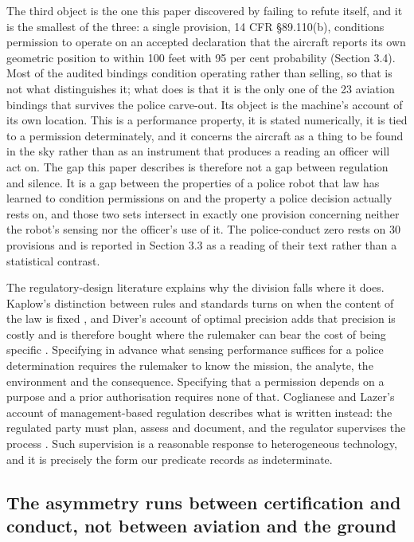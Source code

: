 The third object is the one this paper discovered by failing to refute itself, and it is the smallest of the three: a single provision, 14 CFR \S{}89.110(b), conditions permission to operate on an accepted declaration that the aircraft reports its own geometric position to within 100 feet with 95 per cent probability (Section 3.4). Most of the audited bindings condition operating rather than selling, so that is not what distinguishes it; what does is that it is the only one of the 23 aviation bindings that survives the police carve-out. Its object is the machine's account of its own location. This is a performance property, it is stated numerically, it is tied to a permission determinately, and it concerns the aircraft as a thing to be found in the sky rather than as an instrument that produces a reading an officer will act on. The gap this paper describes is therefore not a gap between regulation and silence. It is a gap between the properties of a police robot that law has learned to condition permissions on and the property a police decision actually rests on, and those two sets intersect in exactly one provision concerning neither the robot's sensing nor the officer's use of it. The police-conduct zero rests on 30 provisions and is reported in Section 3.3 as a reading of their text rather than a statistical contrast.

The regulatory-design literature explains why the division falls where it does. Kaplow's distinction between rules and standards turns on when the content of the law is fixed \citep{Kaplow1992Rules}, and Diver's account of optimal precision adds that precision is costly and is therefore bought where the rulemaker can bear the cost of being specific \citep{Diver1983Precision}. Specifying in advance what sensing performance suffices for a police determination requires the rulemaker to know the mission, the analyte, the environment and the consequence. Specifying that a permission depends on a purpose and a prior authorisation requires none of that. Coglianese and Lazer's account of management-based regulation describes what is written instead: the regulated party must plan, assess and document, and the regulator supervises the process \citep{CoglianeseLazer2003}. Such supervision is a reasonable response to heterogeneous technology, and it is precisely the form our predicate records as indeterminate.

\subsection{The asymmetry runs between certification and conduct, not between aviation and the ground}\label{sec:4.2}

